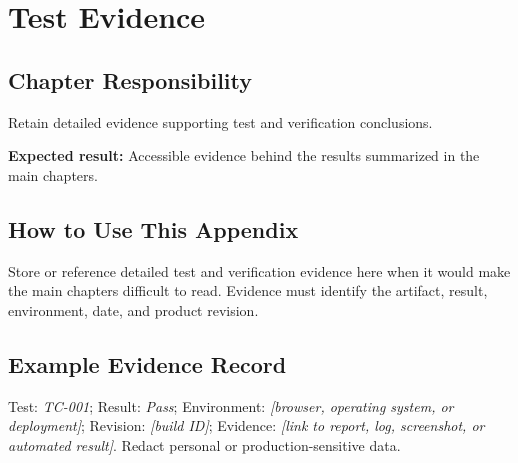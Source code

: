 \chapter{Test Evidence}
\section{Chapter Responsibility}
\label{Section:TestEvidenceResponsibility}
Retain detailed evidence supporting test and verification conclusions.

\noindent\textbf{Expected result:} Accessible evidence behind the results summarized in the main chapters.

\section{How to Use This Appendix}
Store or reference detailed test and verification evidence here when it would make the main chapters difficult to read. Evidence must identify the artifact, result, environment, date, and product revision.
\section{Example Evidence Record}
Test: \textit{TC-001}; Result: \textit{Pass}; Environment: \textit{[browser, operating system, or deployment]}; Revision: \textit{[build ID]}; Evidence: \textit{[link to report, log, screenshot, or automated result]}. Redact personal or production-sensitive data.

